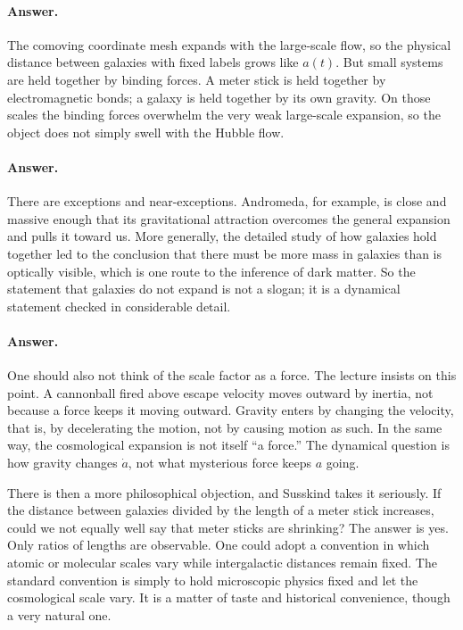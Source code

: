 \paragraph{Answer.} The comoving coordinate mesh expands with the large-scale flow, so the physical distance between galaxies with fixed labels grows like \(a(t)\). But small systems are held together by binding forces. A meter stick is held together by electromagnetic bonds; a galaxy is held together by its own gravity. On those scales the binding forces overwhelm the very weak large-scale expansion, so the object does not simply swell with the Hubble flow.

\paragraph{Answer.} There are exceptions and near-exceptions. Andromeda, for example, is close and massive enough that its gravitational attraction overcomes the general expansion and pulls it toward us. More generally, the detailed study of how galaxies hold together led to the conclusion that there must be more mass in galaxies than is optically visible, which is one route to the inference of dark matter. So the statement that galaxies do not expand is not a slogan; it is a dynamical statement checked in considerable detail.

\paragraph{Answer.} One should also not think of the scale factor as a force. The lecture insists on this point. A cannonball fired above escape velocity moves outward by inertia, not because a force keeps it moving outward. Gravity enters by changing the velocity, that is, by decelerating the motion, not by causing motion as such. In the same way, the cosmological expansion is not itself ``a force.'' The dynamical question is how gravity changes \(\dot a\), not what mysterious force keeps \(a\) going.

There is then a more philosophical objection, and Susskind takes it seriously. If the distance between galaxies divided by the length of a meter stick increases, could we not equally well say that meter sticks are shrinking? The answer is yes. Only ratios of lengths are observable. One could adopt a convention in which atomic or molecular scales vary while intergalactic distances remain fixed. The standard convention is simply to hold microscopic physics fixed and let the cosmological scale vary. It is a matter of taste and historical convenience, though a very natural one.

